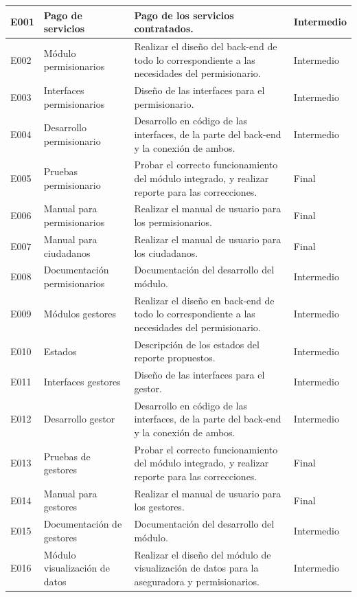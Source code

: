 \documentclass[12pt,twoside]{article}
\begin{document}
\begin{longtable}{|l|m{3cm}|m{6cm}|m{2cm}|}
    E001 & Pago de servicios & Pago de los servicios contratados. & Intermedio \\ \hline
    E002 & Módulo permisionarios & Realizar el diseño del back-end de todo lo correspondiente a las necesidades del permisionario. & Intermedio \\ \hline
    E003 & Interfaces permisionarios & Diseño de las interfaces para el permisionario. & Intermedio \\ \hline
    E004 & Desarrollo permisionario & Desarrollo en código de las interfaces, de la parte del back-end y la conexión de ambos. & Intermedio \\ \hline
    E005 & Pruebas permisionario & Probar el correcto funcionamiento del módulo integrado, y realizar reporte para las correcciones. & Final \\ \hline
    E006 & Manual para permisionarios & Realizar el manual de usuario para los permisionarios. & Final \\ \hline
    E007 & Manual para ciudadanos & Realizar el manual de usuario para los ciudadanos. & Final \\ \hline
    E008 & Documentación permisionarios & Documentación del desarrollo del módulo. & Intermedio \\ \hline
    E009 & Módulos gestores & Realizar el diseño en back-end de todo lo correspondiente a las necesidades del permisionario. & Intermedio \\ \hline
    E010 & Estados & Descripción de los estados del reporte propuestos. & Intermedio \\ \hline
    E011 & Interfaces gestores & Diseño de las interfaces para el gestor. & Intermedio \\ \hline
    E012 & Desarrollo gestor & Desarrollo en código de las interfaces, de la parte del back-end y la conexión de ambos. & Intermedio \\ \hline
    E013 & Pruebas de gestores & Probar el correcto funcionamiento del módulo integrado, y realizar reporte para las correcciones. & Final \\ \hline
    E014 & Manual para gestores & Realizar el manual de usuario para los gestores. & Final \\ \hline
    E015 & Documentación de gestores & Documentación del desarrollo del módulo. & Intermedio \\ \hline
    E016 & Módulo visualización de datos & Realizar el diseño del módulo de visualización de datos para la aseguradora y permisionarios. & Intermedio \\ \hline

\end{longtable}
\end{document}
